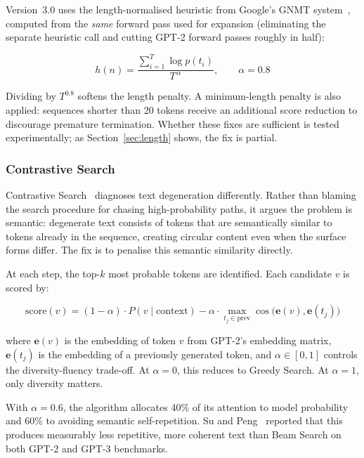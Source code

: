 \documentclass[12pt]{article}
\begin{document}
	Version~3.0 uses the length-normalised heuristic from Google's GNMT system~\cite{wu2016gnmt}, computed from the \emph{same} forward pass used for expansion (eliminating the separate heuristic call and cutting GPT-2 forward passes roughly in half):
	
	\begin{equation}
		h(n) = \frac{\sum_{i=1}^{T} \log p(t_i)}{T^{\,\alpha}}, \qquad \alpha = 0.8
		\label{eq:heuristic}
	\end{equation}
	
	Dividing by $T^{0.8}$ softens the length penalty. A minimum-length penalty is also applied: sequences shorter than 20 tokens receive an additional score reduction to discourage premature termination. Whether these fixes are sufficient is tested experimentally; as Section~\ref{sec:length} shows, the fix is partial.
	
	\subsubsection{Contrastive Search}
	\label{sec:contrastive_theory}
	
	Contrastive Search~\cite{su2022contrastive} diagnoses text degeneration differently. Rather than blaming the search procedure for chasing high-probability paths, it argues the problem is semantic: degenerate text consists of tokens that are semantically similar to tokens already in the sequence, creating circular content even when the surface forms differ. The fix is to penalise this semantic similarity directly.
	
	At each step, the top-$k$ most probable tokens are identified. Each candidate $v$ is scored by:
	
	\begin{equation}
		\mathrm{score}(v) = (1-\alpha) \cdot P(v \mid \text{context})
		- \alpha \cdot \max_{t_j \in \text{prev}} \cos\bigl(\mathbf{e}(v), \mathbf{e}(t_j)\bigr)
		\label{eq:contrastive}
	\end{equation}
	
	where $\mathbf{e}(v)$ is the embedding of token $v$ from GPT-2's embedding matrix, $\mathbf{e}(t_j)$ is the embedding of a previously generated token, and $\alpha \in [0,1]$ controls the diversity-fluency trade-off. At $\alpha = 0$, this reduces to Greedy Search. At $\alpha = 1$, only diversity matters.
	
	With $\alpha = 0.6$, the algorithm allocates 40\% of its attention to model probability and 60\% to avoiding semantic self-repetition. Su and Peng~\cite{su2023contrastive_tacl} reported that this produces measurably less repetitive, more coherent text than Beam Search on both GPT-2 and GPT-3 benchmarks.
	
\end{document}
